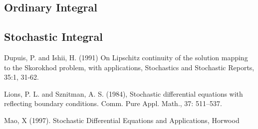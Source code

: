 \documentclass[]{article}
\theoremstyle{definition}
\theoremstyle{assumption}
\theoremstyle{remark}
\begin{document}
\subsection{Ordinary Integral}

\subsection{Stochastic Integral}

\begin{thebibliography}{9}

Dupuis, P. and Ishii, H. (1991) On Lipschitz continuity of the solution
mapping to the Skorokhod problem, with applications, Stochastics and Stochastic Reports,
35:1, 31-62.

 Lions, P. L. and Sznitman, A. S. (1984), Stochastic differential equations with reflecting boundary conditions. Comm. Pure Appl. Math., 37: 511–537.

Mao, X (1997). Stochastic Differential Equations and Applications, Horwood

\end{thebibliography}
\end{document}

